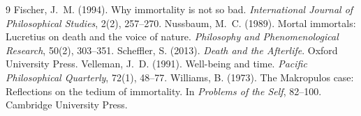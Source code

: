 \documentclass{situationist-preprint}
\begin{document}
\begin{thebibliography}{9}\small
{} Fischer, J.~M. (1994). Why immortality is not so bad. \emph{International Journal of Philosophical Studies}, 2(2), 257--270.
 Nussbaum, M.~C. (1989). Mortal immortals: Lucretius on death and the voice of nature. \emph{Philosophy and Phenomenological Research}, 50(2), 303--351.
 Scheffler, S. (2013). \emph{Death and the Afterlife}. Oxford University Press.
 Velleman, J.~D. (1991). Well-being and time. \emph{Pacific Philosophical Quarterly}, 72(1), 48--77.
 Williams, B. (1973). The Makropulos case: Reflections on the tedium of immortality. In \emph{Problems of the Self}, 82--100. Cambridge University Press.
\end{thebibliography}
\end{document}
